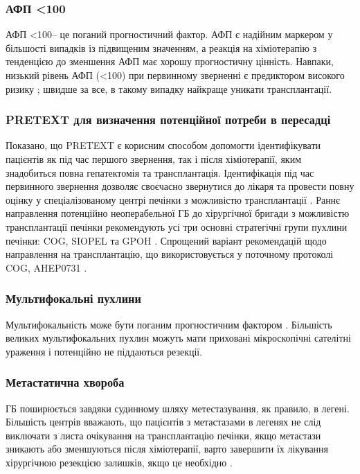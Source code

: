 \subsubsection{АФП <100} 
АФП <100– це поганий прогностичний фактор. АФП є надійним маркером у більшості випадків із підвищеним значенням, а реакція на хіміотерапію з тенденцією до зменшення АФП має хорошу прогностичну цінність. Навпаки, низький рівень АФП (<100) при первинному зверненні є предиктором високого ризику \cite{pmid1328586}; швидше за все, в такому випадку найкраще уникати трансплантації.

\subsubsection{PRETEXT для визначення потенційної потреби в пересадці} 
Показано, що PRETEXT є корисним способом допомогти ідентифікувати пацієнтів як під час першого звернення, так і після хіміотерапії, яким знадобиться повна гепатектомія та трансплантація. Ідентифікація під час первинного звернення дозволяє своєчасно звернутися до лікаря та провести повну оцінку у спеціалізованому центрі печінки з можливістю трансплантації \cite{pmid1323649}. Раннє направлення потенційно неоперабельної ГБ до хірургічної бригади з можливістю трансплантації печінки рекомендують усі три основні стратегічні групи пухлини печінки: COG, SIOPEL та GPOH \cite{pmid18970927}. Спрощений варіант рекомендацій щодо направлення на трансплантацію, що використовується у поточному протоколі COG, AHEP0731 \cite{pmid1323649}.

\subsubsection{Мультифокальні пухлини} 
Мультифокальність може бути поганим прогностичним фактором \cite{pmid28126357}. Більшість великих мультифокальних пухлин можуть мати приховані мікроскопічні сателітні ураження і потенційно не піддаються резекції. 

\subsubsection{Метастатична хвороба} 
ГБ поширюється завдяки судинному шляху метестазування, як правило, в легені. Більшість центрів вважають, що пацієнтів з метастазами в легенях не слід виключати з листа очікування на трансплантацію печінки, якщо метастази зникають або зменшуються після хіміотерапії, варто завершити їх лікування хірургічною резекцією залишків, якщо це необхідно \cite{pmid22201955}.

